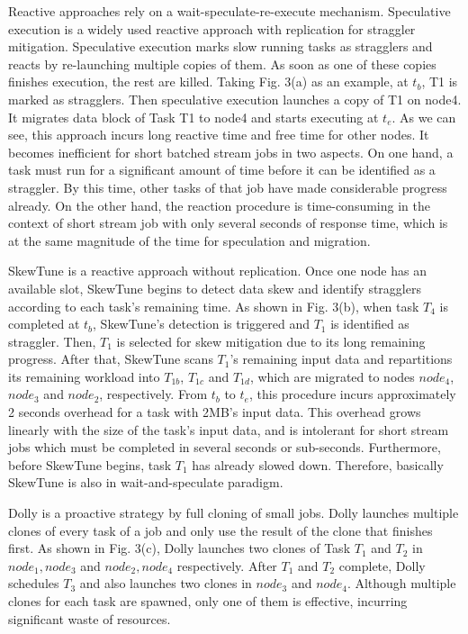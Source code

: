 \documentclass[10pt,conference,compsocconf,letterpaper]{IEEEtran}
\begin{document}
  Reactive approaches rely on a wait-speculate-re-execute mechanism. Speculative execution \cite{Dean2004} is a widely used reactive approach with replication for straggler mitigation. Speculative execution marks slow running tasks as stragglers and reacts by re-launching multiple copies of them. As soon as one of these copies finishes execution, the rest are killed. Taking Fig. 3(a) as an example, at $t_b$, T1 is marked as stragglers. Then speculative execution launches a copy of T1 on node4. It migrates data block of Task T1 to node4 and starts executing at $t_e$. As we can see, this approach incurs long reactive time and free time for other nodes. It becomes inefficient for short batched stream jobs in two aspects. On one hand, a task must run for a significant amount of time before it can be identified as a straggler. By this time, other tasks of that job have made considerable progress already. On the other hand, the reaction procedure is time-consuming in the context of short stream job with only several seconds of response time, which is at the same magnitude of the time for speculation and migration.

  SkewTune \cite{Kwon2012} is  a reactive approach  without replication. Once one node has an available slot, SkewTune begins to detect data skew and identify stragglers according to each task's remaining time. As shown in Fig. 3(b), when task $T_4$ is completed at $t_b$, SkewTune's detection is triggered and $T_1$ is identified as straggler. Then, $T_1$ is selected for skew mitigation due to its long remaining progress. After that, SkewTune scans $T_1$'s remaining input data and repartitions its remaining workload into $T_{1b}$, $T_{1c}$ and $T_{1d}$, which  are  migrated to nodes $node_4$, $node_3$ and $node_2$, respectively. From $t_b$ to $t_e$, this procedure incurs approximately 2 seconds overhead for a task with 2MB's input data. This overhead grows linearly with the size of the task's input data, and is intolerant for short stream jobs which must be completed in several seconds or sub-seconds. Furthermore, before SkewTune begins, task $T_1$ has already slowed down. Therefore, basically SkewTune is also in wait-and-speculate paradigm.

  Dolly \cite{Ananthanarayanan2013} is a proactive strategy by full cloning of small jobs. Dolly launches multiple clones of every task of a job and only use the result of the clone that finishes first. As shown in Fig. 3(c), Dolly launches two clones of Task $T_1$ and $T_2$ in $node_1, node_3$ and $node_2, node_4$ respectively. After $T_1$ and $T_2$ complete, Dolly schedules $T_3$ and also launches two clones in $node_3$ and $node_4$. Although multiple clones for each task are spawned, only one of them is effective, incurring significant waste of resources.
\end{document}
